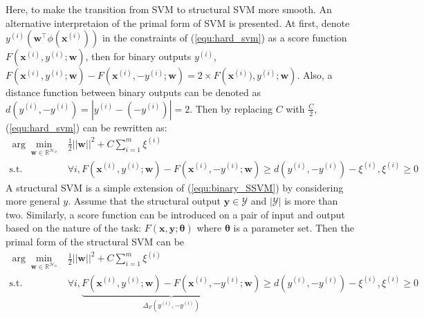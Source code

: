 Here, to make the transition from SVM to structural SVM more smooth. An alternative interpretaion  
of the primal form of SVM is presented. 
At first, denote $y^{(i)} \left(\mathbf{w}^\top \phi (\mathbf{x}^{(i)})\right)$ in the constraints of (\ref{equ:hard_svm}) as a score function $F(\mathbf{x}^{(i)},y^{(i)}; \mathbf{w})$, then  
for binary outputs $y^{(i)}$, $F\left(\mathbf{x}^{(i)},y^{(i)}; \mathbf{w}\right)- F\left(\mathbf{x}^{(i)},-y^{(i)}; \mathbf{w}\right)=2\times F\left(\mathbf{x}^{(i)}),y^{(i)}; \mathbf{w}\right)$. 
Also, a distance function between binary outputs can be denoted as $d(y^{(i)},-y^{(i)})=|y^{(i)}-(-y^{(i)})|=2$. Then by replacing $C$ with $\frac{C}{2}$, (\ref{equ:hard_svm}) can be rewritten 
as:
\begin{equation}
\begin{array}{rl}
\displaystyle \arg\min_{ \mathbf{w} \in \mathbb{R}^{\mathcal{H_{\phi}}}}   & \frac{1}{2} ||\mathbf{w}||^2+C\sum_{i=1}^m \xi^{(i)} \\
                                                                       \text{s.t.} & \forall i, F\left(\mathbf{x}^{(i)},y^{(i)}; \mathbf{w}\right)- F\left(\mathbf{x}^{(i)},-y^{(i)}; \mathbf{w}\right) \geq d(y^{(i)},-y^{(i)})-\xi^{(i)}, \xi^{(i)} \geq 0 
\end{array}
\label{equ:binary_SSVM}
\end{equation}
A structural SVM is a simple extension of (\ref{equ:binary_SSVM}) by considering more general $y$. 
Assume that the structural output $\mathbf{y}\in\mathcal{Y}$ and $|\mathcal{Y}|$ is more than 
two. Similarly, a score function can be introduced on a pair of input and output based on the 
nature of the task: $F(\mathbf{x},\mathbf{y};\boldsymbol{\theta})$ where $\boldsymbol{\theta}$ is
a parameter set. Then the primal form of the structural SVM can be   
\begin{equation}
\begin{array}{rl}
\displaystyle \arg\min_{ \mathbf{w} \in \mathbb{R}^{\mathcal{H_{\phi}}}}   & \frac{1}{2} ||\mathbf{w}||^2+C\sum_{i=1}^m \xi^{(i)} \\
                                                                       \text{s.t.} & \forall i, \underbrace{F\left(\mathbf{x}^{(i)},y^{(i)}; \mathbf{w}\right)- F\left(\mathbf{x}^{(i)},-y^{(i)}; \mathbf{w}\right)}_{\Delta_F(y^{(i)},-y^{(i)})} \geq d(y^{(i)},-y^{(i)})-\xi^{(i)}, \xi^{(i)} \geq 0 
\end{array}
\label{equ:binary_SSVM}
\end{equation}

